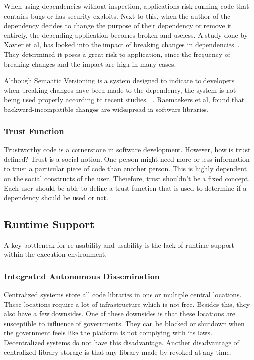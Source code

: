 When using dependencies without inspection, applications risk running code that contains bugs or has security exploits. Next to this, when the author of the dependency decides to change the purpose of their dependency or remove it entirely, the depending application becomes broken and useless. A study done by Xavier et al, has looked into the impact of breaking changes in dependencies~\cite{xavier2017historical}. They determined it poses a great risk to application, since the frequency of breaking changes and the impact are high in many cases.

Although Semantic Versioning is a system designed to indicate to developers when breaking changes have been made to the dependency, the system is not being used properly according to recent studies~\cite{raemaekers2014semantic}~\cite{raemaekers2017semantic}. Raemaekers et al, found that backward-incompatible changes are widespread in software libraries.

\subsubsection{\textbf{Trust Function}}
Trustworthy code is a cornerstone in software development. However, how is trust defined? Trust is a social notion. One person might need more or less information to trust a particular piece of code than another person. This is highly dependent on the social constructs of the user. Therefore, trust shouldn't be a fixed concept. Each user should be able to define a trust function that is used to determine if a dependency should be used or not.

\subsection{Runtime Support}

A key bottleneck for re-usability and usability is the lack of runtime support within the execution environment.

\subsubsection{\textbf{Integrated Autonomous Dissemination}}

Centralized systems store all code libraries in one or multiple central locations. These locations require a lot of infrastructure which is not free. Besides this, they also have a few downsides. One of these downsides is that these locations are susceptible to influence of governments. They can be blocked or shutdown when the government feels like the platform is not complying with its laws. Decentralized systems do not have this disadvantage. Another disadvantage of centralized library storage is that any library made by revoked at any time.

